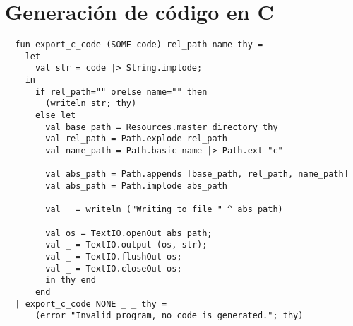 \chapter{Generación de código en C}
\label{ap:generate_c_code}

\begin{lstlisting}
  fun export_c_code (SOME code) rel_path name thy =
    let
      val str = code |> String.implode;
    in
      if rel_path="" orelse name="" then
        (writeln str; thy)
      else let
        val base_path = Resources.master_directory thy
        val rel_path = Path.explode rel_path
        val name_path = Path.basic name |> Path.ext "c"

        val abs_path = Path.appends [base_path, rel_path, name_path]
        val abs_path = Path.implode abs_path

        val _ = writeln ("Writing to file " ^ abs_path)

        val os = TextIO.openOut abs_path;
        val _ = TextIO.output (os, str);
        val _ = TextIO.flushOut os;
        val _ = TextIO.closeOut os;
        in thy end
      end
  | export_c_code NONE _ _ thy =
      (error "Invalid program, no code is generated."; thy)
\end{lstlisting}
